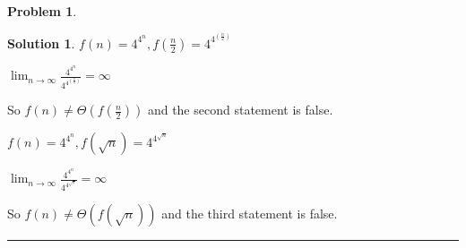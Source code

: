 \documentclass{article}
\theoremstyle{definition}
\newtheorem{problem}{Problem}
\def\fline{\rule{0.75\linewidth}{0.5pt}}
\newcommand{\finishline}{\begin{center}\fline\end{center}}
\newtheorem*{solution*}{Solution}
\newenvironment{solution}{\begin{solution*}}{{\finishline} \end{solution*}}
\begin{document}
\begin{problem}
\begin{solution}
	\item $f(n) = 4^{4^n}, f(\frac{n}{2}) = 4^{4^{(\frac{n}{2})}} $
	\begin{center}
		\item $\lim_{n \to \infty}\frac{4^{4^n}}{4^{4^{(\frac{n}{2})}}} = \infty$
		\item So $f(n) \neq \Theta(f(\frac{n}{2}))$ and the second statement is false.
	\end{center}

	\item $f(n) = 4^{4^n}, f(\sqrt n) = 4^{4^{\sqrt n}} $
	\begin{center}
		\item $\lim_{n \to \infty}\frac{4^{4^n}}{4^{4^{\sqrt n}}} = \infty$
		\item So $f(n) \neq \Theta(f(\sqrt n))$ and the third statement is false.
	\end{center}

\end{solution}



\end{problem}


\smallskip
\end{document}
